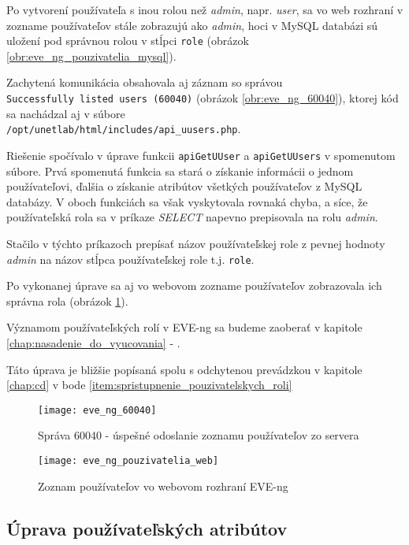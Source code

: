 Po vytvorení používateľa s inou rolou než \emph{admin}, napr. \emph{user}, sa vo web rozhraní v zozname používateľov stále zobrazujú ako \emph{admin}, hoci v MySQL databázi sú uložení pod správnou rolou v stĺpci \texttt{role} (obrázok \ref{obr:eve_ng_pouzivatelia_mysql}).

Zachytená komunikácia obsahovala aj záznam so správou \\
\texttt{Successfully listed users (60040)} (obrázok \ref{obr:eve_ng_60040}),
ktorej kód sa nachádzal aj v súbore \\
\texttt{/opt/unetlab/html/includes/api\_uusers.php}.

Riešenie spočívalo v úprave funkcii \texttt{apiGetUUser} a \texttt{apiGetUUsers} v spomenutom súbore. Prvá spomenutá funkcia sa stará o získanie informácii o jednom používateľovi, ďalšia o získanie atribútov všetkých používateľov z MySQL databázy. V oboch funkciách sa však vyskytovala rovnaká chyba, a síce, že používateľská rola sa v príkaze \emph{SELECT} napevno prepisovala na rolu \emph{admin}.

Stačilo v týchto príkazoch prepísať názov používateľskej role z pevnej hodnoty \emph{admin} na názov stĺpca používateľskej role t.j. \texttt{role}.

Po vykonanej úprave sa aj vo webovom zozname používateľov zobrazovala ich správna rola (obrázok \ref{obr:eve_ng_pouzivatelia_web}).

Významom používateľských rolí v EVE-ng sa budeme zaoberať v kapitole \ref{chap:nasadenie_do_vyucovania} - .

Táto úprava je bližšie popísaná spolu s odchytenou prevádzkou v kapitole \ref{chap:cd} v bode \ref{item:spristupnenie_pouzivatelskych_roli}

\begin{figure}
    \centering
    \texttt{[image: eve\_ng\_60040]}
    \caption{Správa 60040 - úspešné odoslanie zoznamu používateľov zo servera}
    \label{obr:eve_ng_60040}
    
    \centering
    \texttt{[image: eve\_ng\_pouzivatelia\_web]}
    \caption{Zoznam používateľov vo webovom rozhraní EVE-ng}
    \label{obr:eve_ng_pouzivatelia_web}
\end{figure}






\subsection{Úprava používateľských atribútov}

